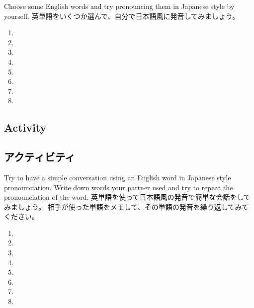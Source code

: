 \documentclass[uplatex,dvipdfmx,b5paper,english,10pt]{jsbook}
\begin{document}
\begin{toiquestion}
\ifEnglish
Choose some English words and try pronouncing them in Japanese style by yourself.
\else
英単語をいくつか選んで、自分で日本語風に発音してみましょう。
\fi
\end{toiquestion}

\begin{multicols}{2}
 \begin{enumerate}
   \item \hrulefill
   \item \hrulefill
   \item \hrulefill
   \item \hrulefill
   \item \hrulefill
   \item \hrulefill
   \item \hrulefill
   \item \hrulefill
 \end{enumerate}
\end{multicols}

\ifEnglish
\subsection{Activity}
\else
\subsection{アクティビティ}
\fi

\begin{toiquestion}
\ifEnglish
Try to have a simple conversation using an English word in Japanese style pronounciation.
Write down words your partner used and try to repeat the pronounciation of the word.
\else
英単語を使って日本語風の発音で簡単な会話をしてみましょう。
相手が使った単語をメモして、その単語の発音を繰り返してみてください。
\fi
\end{toiquestion}

\begin{multicols}{2}
 \begin{enumerate}
   \item \hrulefill
   \item \hrulefill
   \item \hrulefill
   \item \hrulefill
   \item \hrulefill
   \item \hrulefill
   \item \hrulefill
   \item \hrulefill
 \end{enumerate}
\end{multicols}
\end{document}

